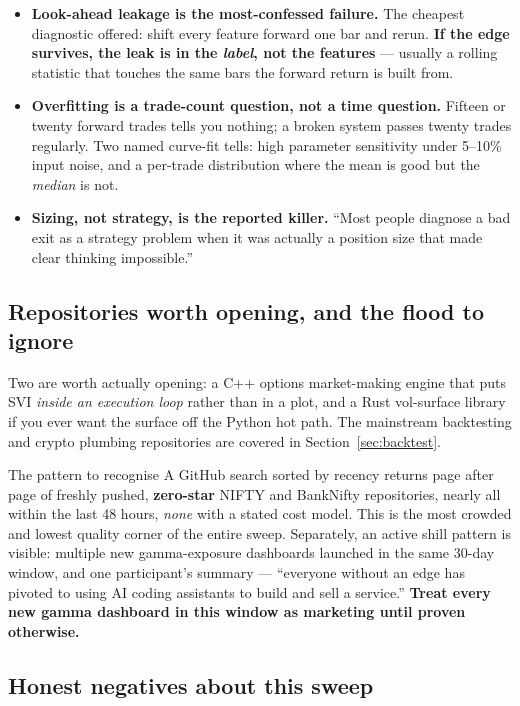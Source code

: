 \documentclass[11pt,a4paper]{article}
\begin{document}
\begin{itemize}
\item \textbf{Look-ahead leakage is the most-confessed failure.} The cheapest
diagnostic offered: shift every feature forward one bar and rerun. \textbf{If the
edge survives, the leak is in the \emph{label}, not the features} --- usually a
rolling statistic that touches the same bars the forward return is built from.
\item \textbf{Overfitting is a trade-count question, not a time question.} Fifteen
or twenty forward trades tells you nothing; a broken system passes twenty trades
regularly. Two named curve-fit tells: high parameter sensitivity under 5--10\%
input noise, and a per-trade distribution where the mean is good but the
\emph{median} is not.
\item \textbf{Sizing, not strategy, is the reported killer.} ``Most people diagnose
a bad exit as a strategy problem when it was actually a position size that made
clear thinking impossible.''
\end{itemize}

\subsection{Repositories worth opening, and the flood to ignore}

Two are worth actually opening: a C++ options market-making engine that puts SVI
\emph{inside an execution loop} rather than in a plot, and a Rust vol-surface
library if you ever want the surface off the Python hot path. The mainstream
backtesting and crypto plumbing repositories are covered in
Section~\ref{sec:backtest}.

\begin{keyfact}{The pattern to recognise}
A GitHub search sorted by recency returns page after page of freshly pushed,
\textbf{zero-star} NIFTY and BankNifty repositories, nearly all within the last
48 hours, \emph{none} with a stated cost model. This is the most crowded and lowest
quality corner of the entire sweep. Separately, an active shill pattern is visible:
multiple new gamma-exposure dashboards launched in the same 30-day window, and one
participant's summary --- ``everyone without an edge has pivoted to using AI coding
assistants to build and sell a service.'' \textbf{Treat every new gamma dashboard in
this window as marketing until proven otherwise.}
\end{keyfact}

\subsection{Honest negatives about this sweep}
\end{document}
